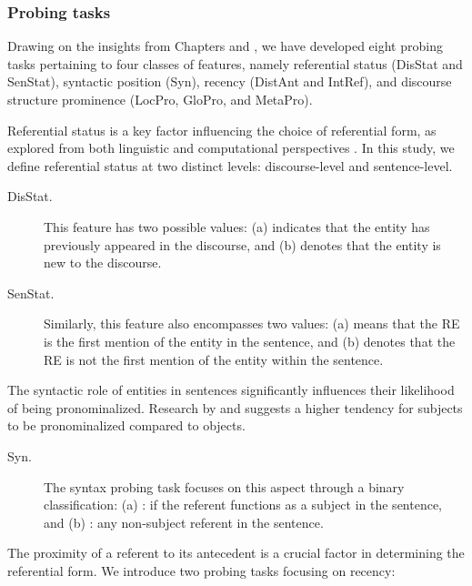\subsubsection{Probing tasks} \label{sec:task}

Drawing on the insights from Chapters \2 and \5, we have developed eight probing tasks pertaining to four classes of features, namely referential status (DisStat and SenStat), syntactic position (Syn), recency (DistAnt and IntRef), and discourse structure prominence (LocPro, GloPro, and MetaPro).


Referential status is a key factor influencing the choice of referential form, as explored from both linguistic and computational perspectives \citep{chafe1976givenness,gundel1993cognitive,castro-ferreira-etal-2016-towards-variation}. In this study, we define referential status at two distinct levels: discourse-level and sentence-level.

\begin{description}
	\item[DisStat.] This feature has two possible values: (a)  indicates that the entity has previously appeared in the discourse, and (b)  denotes that the entity is new to the discourse.
	\item[SenStat.] Similarly, this feature also encompasses two values: (a)  means that the RE is the first mention of the entity in the sentence, and (b)  denotes that the RE is not the first mention of the entity within the sentence.
\end{description}


The syntactic role of entities in sentences significantly influences their likelihood of being pronominalized. Research by \citet{Brennan1995} and \citet{Arnold2010} suggests a higher tendency for subjects to be pronominalized compared to objects. 

\begin{description}
	\item[Syn.] The syntax probing task focuses on this aspect through a binary classification: (a) : if the referent functions as a subject in the sentence, and (b) : any non-subject referent in the sentence.
\end{description}


 The proximity of a referent to its antecedent is a crucial factor in determining the referential form. We introduce two probing tasks focusing on recency: 

